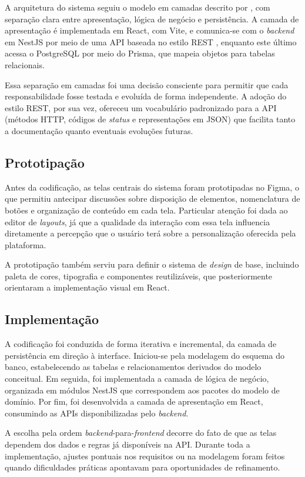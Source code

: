 A arquitetura do sistema seguiu o modelo em camadas descrito por \cite{Fowler2002}, com separação clara entre apresentação, lógica de negócio e persistência. A camada de apresentação é implementada em React, com Vite, e comunica-se com o \textit{backend} em NestJS por meio de uma API baseada no estilo REST \cite{Fielding2000}, enquanto este último acessa o PostgreSQL por meio do Prisma, que mapeia objetos para tabelas relacionais.

Essa separação em camadas foi uma decisão consciente para permitir que cada responsabilidade fosse testada e evoluída de forma independente. A adoção do estilo REST, por sua vez, ofereceu um vocabulário padronizado para a API (métodos HTTP, códigos de \textit{status} e representações em JSON) que facilita tanto a documentação quanto eventuais evoluções futuras.

\subsection{Prototipação}

Antes da codificação, as telas centrais do sistema foram prototipadas no Figma, o que permitiu antecipar discussões sobre disposição de elementos, nomenclatura de botões e organização de conteúdo em cada tela. Particular atenção foi dada ao editor de \textit{layouts}, já que a qualidade da interação com essa tela influencia diretamente a percepção que o usuário terá sobre a personalização oferecida pela plataforma.

A prototipação também serviu para definir o sistema de \textit{design} de base, incluindo paleta de cores, tipografia e componentes reutilizáveis, que posteriormente orientaram a implementação visual em React.

\subsection{Implementação}

A codificação foi conduzida de forma iterativa e incremental, da camada de persistência em direção à interface. Iniciou-se pela modelagem do esquema do banco, estabelecendo as tabelas e relacionamentos derivados do modelo conceitual. Em seguida, foi implementada a camada de lógica de negócio, organizada em módulos NestJS que correspondem aos pacotes do modelo de domínio. Por fim, foi desenvolvida a camada de apresentação em React, consumindo as APIs disponibilizadas pelo \textit{backend}.

A escolha pela ordem \textit{backend}-para-\textit{frontend} decorre do fato de que as telas dependem dos dados e regras já disponíveis na API. Durante toda a implementação, ajustes pontuais nos requisitos ou na modelagem foram feitos quando dificuldades práticas apontavam para oportunidades de refinamento.

